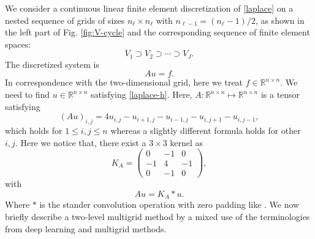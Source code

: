 We consider a continuous linear finite element discretization of
\eqref{laplace} on a nested sequence of grids of sizes $n_\ell\times
n_\ell$ with $n_{\ell-1}=(n_\ell-1)/2$, as shown in the left part of
Fig. \ref{fig:V-cycle} and the corresponding sequence of finite
element spaces:
$$
V_1\supset V_2\supset\cdots\supset V_J.
$$
The discretized system is
\begin{equation}
\label{laplace-h}
Au=f.
\end{equation}
In correspondence with the two-dimensional grid, here we treat $f\in \mathbb R^{n\times n}$.  We need to find $u\in \mathbb R^{n\times n}$ satisfying \eqref{laplace-h}.
Here,  $A:\mathbb R^{n\times n}\mapsto \mathbb R^{n\times n}$ is a tensor satisfying
\begin{equation}
\label{uniform-laplace}
(Au)_{i,j}=4u_{i,j}-u_{i+1,j}-u_{i-1,j}-u_{i,j+1}-u_{i,j-1},
\end{equation}
which holds for $1\le i,j \le n$ whereas a slightly different formula holds for
other $i, j$. Here we notice that, there exist a $3\times 3$ kernel as
\begin{equation}\label{eq:kernel-A}
K_A = \begin{pmatrix}
0 & -1 & 0 \\
-1 & 4 & -1 \\
0 & -1 & 0
\end{pmatrix},
\end{equation}
with 
$$
Au = K_A \ast u.
$$
Where $\ast$ is the stander convolution operation with zero padding like \cite{goodfellow2017deep}. 
We now briefly describe a two-level multigrid method by
a mixed use of the terminologies from deep learning \cite{goodfellow2017deep} and multigrid methods.

